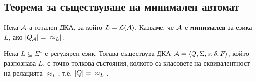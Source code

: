 \subsection{Теорема за съществуване на минимален автомат}

\begin{dfn}
  Нека $\mathcal{A}$ а тотален ДКА, за който $L = \mathcal{L}(\mathcal{A})$.
  Казваме, че $\mathcal{A}$ е {\bf минимален} за езика $L$, ако $\lvert{Q_{\mathcal{A}}}\rvert = \lvert{\approx_L}\rvert$.
\end{dfn}

\begin{thm}
  \label{th:myhill-nerode}
  Нека $L\subseteq \Sigma^\star$ е регулярен език.
  Тогава съществува ДКА $\mathcal{A} = \langle{Q,\Sigma,s,\delta,F}\rangle$, който разпознава $L$,
  с точно толкова състояния, колкото са класовете на еквивалентност на релацията $\approx_L$,
  т.е. $\lvert{Q}\rvert = \lvert{\approx_L}\rvert$.
\end{thm}
